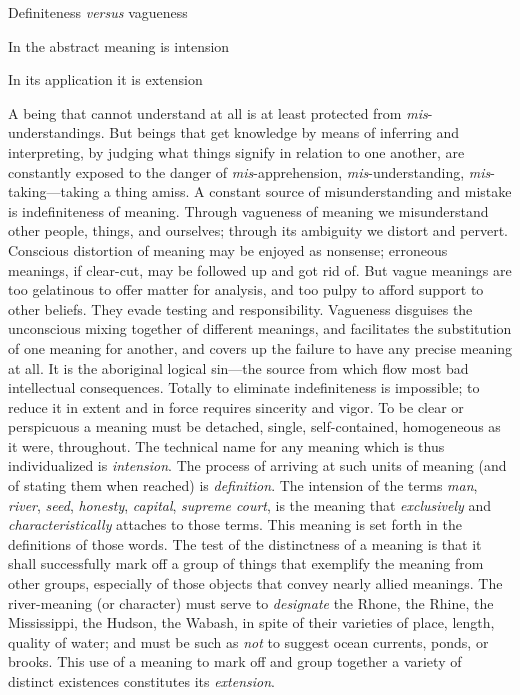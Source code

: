 \documentclass[letterpaper]{book}
\begin{document}
Definiteness \emph{versus} vagueness

In the abstract meaning is intension

In its application it is extension

A being that cannot understand at all is at least protected from
\emph{mis}-understandings. But beings that get knowledge by means of
inferring and interpreting, by judging what things signify in relation
to one another, are constantly exposed to the danger of
\emph{mis}-apprehension, \emph{mis}-understanding,
\emph{mis}-taking---taking a thing amiss. A constant source of
misunderstanding and mistake is indefiniteness of meaning. Through
vagueness
of
meaning we misunderstand other people, things, and ourselves; through
its ambiguity we distort and pervert. Conscious distortion of meaning
may be enjoyed as nonsense; erroneous meanings, if clear-cut, may be
followed up and got rid of. But vague meanings are too gelatinous to
offer matter for analysis, and too pulpy to afford support to other
beliefs. They evade testing and responsibility. Vagueness disguises the
unconscious mixing together of different meanings, and facilitates the
substitution of one meaning for another, and covers up the failure to
have any precise meaning at all. It is the aboriginal logical sin---the
source from which flow most bad intellectual consequences. Totally to
eliminate indefiniteness is impossible; to reduce it in extent and in
force requires sincerity and vigor. To be clear or perspicuous a meaning
must be detached, single, self-contained, homogeneous as it were,
throughout. The technical name for any meaning which is thus
individualized is \emph{intension}. The process of arriving at such
units of meaning (and of stating them when reached) is
\emph{definition}. The intension of the terms \emph{man}, \emph{river},
\emph{seed}, \emph{honesty}, \emph{capital}, \emph{supreme court}, is
the meaning that \emph{exclusively} and \emph{characteristically}
attaches to those terms. This meaning is set forth in the definitions of
those words. The test of the distinctness of a meaning is that it shall
successfully mark off a group of things that exemplify the meaning from
other groups, especially of those objects that convey nearly allied
meanings. The river-meaning (or character) must serve to
\emph{designate} the Rhone, the Rhine, the Mississippi, the Hudson, the
Wabash, in spite of their varieties of place, length, quality of water;
and must be such as \emph{not} to suggest ocean currents, ponds, or
brooks. This use of a
meaning
to mark off and group together a variety of distinct existences
constitutes its \emph{extension}.
\end{document}
